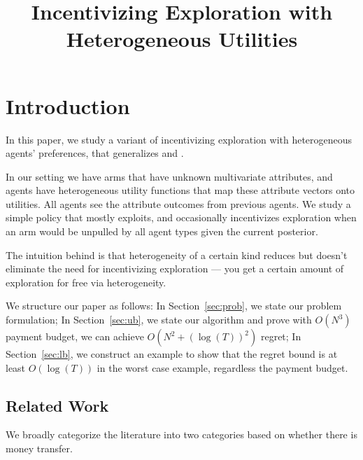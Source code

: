 \documentclass{article}
\title{Incentivizing Exploration with Heterogeneous Utilities}
\begin{document}
\maketitle


\section{Introduction}
In this paper, we study a variant of incentivizing exploration with heterogeneous agents' preferences, that generalizes \cite{frazier2014incentivizing} and \cite{han2015incentivizing}. 

In our setting we have arms that have unknown multivariate attributes, and agents have heterogeneous utility functions that map these attribute vectors onto utilities. All agents see the attribute outcomes from previous agents. We study a simple policy that mostly exploits, and occasionally incentivizes exploration when an arm would be unpulled by all agent types given the current posterior.  

The intuition behind is that heterogeneity of a certain kind reduces but doesn't eliminate the need for incentivizing exploration --- you get a certain amount of exploration for free via heterogeneity.

We structure our paper as follows: In Section~\ref{sec:prob}, we state our problem formulation; In Section~\ref{sec:ub}, we state our algorithm and prove with $O(N^3)$ payment budget, we can achieve $O(N^2+(\log(T))^2)$ regret; In Section~\ref{sec:lb}, we construct an example to show that the regret bound is at least $O(\log(T))$ in the worst case example, regardless the payment budget.


\subsection{Related Work}

We broadly categorize the literature into two categories based on whether there is money transfer.
\end{document}
